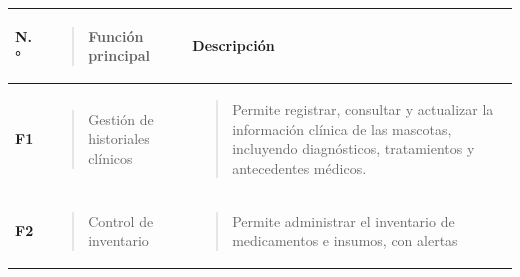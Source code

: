 \documentclass[
]{article}
\newcounter{none} %
\begin{document}
{\def\LTcaptype{none} %
\begin{longtable}[]{@{}
  >{\centering\arraybackslash}p{}
  >{\raggedright\arraybackslash}p{}
  >{\raggedright\arraybackslash}p{}@{}}
\toprule\noalign{}
\begin{minipage}[b]{\linewidth}\centering
\textbf{N.°}
\end{minipage} & \begin{minipage}[b]{\linewidth}\raggedright
\begin{quote}
\textbf{Función principal}
\end{quote}
\end{minipage} & \begin{minipage}[b]{\linewidth}\centering
\textbf{Descripción}
\end{minipage} \\
\midrule\noalign{}
\endhead
\bottomrule\noalign{}
\endlastfoot
\textbf{F1} & \begin{minipage}[t]{\linewidth}\raggedright
\begin{quote}
Gestión de historiales clínicos
\end{quote}
\end{minipage} & \begin{minipage}[t]{\linewidth}\raggedright
\begin{quote}
Permite registrar, consultar y actualizar la información clínica de las
mascotas, incluyendo diagnósticos, tratamientos y antecedentes médicos.
\end{quote}
\end{minipage} \\
\textbf{F2} & \begin{minipage}[t]{\linewidth}\raggedright
\begin{quote}
Control de inventario
\end{quote}
\end{minipage} & \begin{minipage}[t]{\linewidth}\raggedright
\begin{quote}
Permite administrar el inventario de medicamentos e insumos, con alertas


\end{quote}
\end{minipage}
\end{longtable}}
\end{document}
